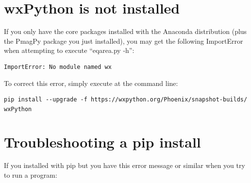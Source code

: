 \documentclass[11pt]{book}
\begin{document}
{{%






\section{wxPython is not installed}

If you only have the core packages installed with the Anaconda distribution (plus the PmagPy package you just installed), you may get the following ImportError when attempting to execute ``eqarea.py -h'':

\begin{verbatim}
ImportError: No module named wx
\end{verbatim}

To correct this error, simply execute at the command line:
\begin{verbatim}
pip install --upgrade -f https://wxpython.org/Phoenix/snapshot-builds/ wxPython
\end{verbatim}


\section{Troubleshooting a pip install}
If you installed with pip but you have this error message or similar when you try to run a program:

}}
\end{document}

